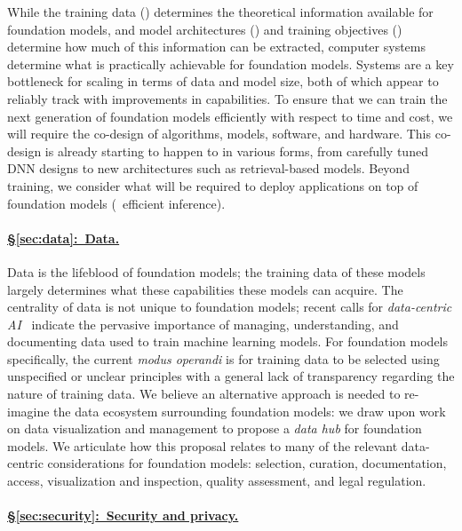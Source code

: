 While the training data () determines the theoretical information available for foundation models, and model architectures () and training objectives () determine how much of this information can be extracted, computer systems determine what is practically achievable for foundation models.
Systems are a key bottleneck for scaling in terms of data and model size, both of which appear to reliably track with improvements in capabilities. 
To ensure that we can train the next generation of foundation models efficiently with respect to time and cost, we will require the co-design of algorithms, models, software, and hardware.
This co-design is already starting to happen to in various forms, from carefully tuned DNN designs to new architectures such as retrieval-based models. 
Beyond training, we consider what will be required to deploy applications on top of foundation models (\eg~efficient inference).

\paragraph{\hyperref[sec:data]{§\ref{sec:data}:~Data.}}

Data is the lifeblood of foundation models; the training data of these models largely determines what these capabilities these models can acquire. 
The centrality of data is not unique to foundation models; recent calls for {\em data-centric AI}~\citep{ng_data_centric, hazy_data_centric} indicate the pervasive importance of managing, understanding,  and documenting data used to train machine learning models.
For foundation models specifically, the current \textit{modus operandi} is for training data to be selected using unspecified or unclear principles with a general lack of transparency regarding the nature of training data.
We believe an alternative approach is needed to re-imagine the data ecosystem surrounding foundation models: we draw upon work on data visualization and management to propose a \textit{data hub} for foundation models.
We articulate how this proposal relates to many of the relevant data-centric considerations for foundation models: selection, curation, documentation, access, visualization and inspection, quality assessment, and legal regulation.

\paragraph{\hyperref[sec:security]{§\ref{sec:security}:~Security and privacy.}}

